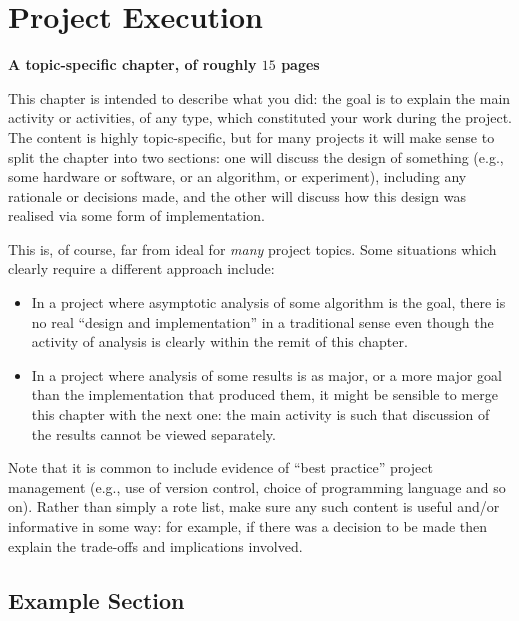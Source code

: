 \documentclass[ %
                    author={Manan Vaswani},
                supervisor={Dr. Raphael Clifford},
                    degree={MEng},
                     title={A multi-core CPU implementation \n of the classical Boson Sampling algorithm},
                  subtitle={},
                      type={},
                      year={2019} ]{dissertation}
\begin{document}

\chapter{Project Execution}
\label{chap:execution}

{\bf A topic-specific chapter, of roughly $15$ pages} 
\vspace{1cm} 

\noindent
This chapter is intended to describe what you did: the goal is to explain
the main activity or activities, of any type, which constituted your work 
during the project.  The content is highly topic-specific, but for many 
projects it will make sense to split the chapter into two sections: one 
will discuss the design of something (e.g., some hardware or software, or 
an algorithm, or experiment), including any rationale or decisions made, 
and the other will discuss how this design was realised via some form of 
implementation.  

This is, of course, far from ideal for {\em many} project topics.  Some
situations which clearly require a different approach include:

\begin{itemize}
\item In a project where asymptotic analysis of some algorithm is the goal,
      there is no real ``design and implementation'' in a traditional sense
      even though the activity of analysis is clearly within the remit of
      this chapter.
\item In a project where analysis of some results is as major, or a more
      major goal than the implementation that produced them, it might be
      sensible to merge this chapter with the next one: the main activity 
      is such that discussion of the results cannot be viewed separately.
\end{itemize}

\noindent
Note that it is common to include evidence of ``best practice'' project 
management (e.g., use of version control, choice of programming language 
and so on).  Rather than simply a rote list, make sure any such content 
is useful and/or informative in some way: for example, if there was a 
decision to be made then explain the trade-offs and implications 
involved.

\section{Example Section}
\end{document}
